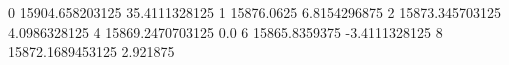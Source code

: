 0 15904.658203125 35.4111328125
1 15876.0625 6.8154296875
2 15873.345703125 4.0986328125
4 15869.2470703125 0.0
6 15865.8359375 -3.4111328125
8 15872.1689453125 2.921875
